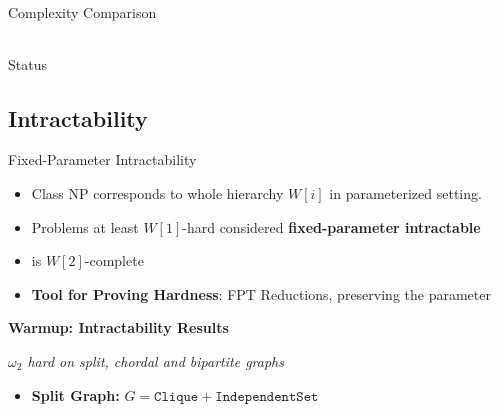 \begin{frame}[c]{Complexity Comparison}
{\begin{tabularx}{1.5\textwidth}{lllllll}
    \end{tabularx}
}
\end{frame}

\begin{frame}[c]{Status \sdom}
 \begin{figure}
    \centering

    \makeatletter
    \resizebox{0.7\textwidth}{!}{
        
    }
    \makeatother
\end{figure}
\end{frame}

\subsection{Intractability}
\begin{frame}[c]{Fixed-Parameter Intractability}
    \begin{itemize}
        \item  Class NP corresponds to whole hierarchy $W[i]$ in parameterized setting.
        \item Problems at least $W[1]$-hard considered \textbf{fixed-parameter intractable}
        \item \dom is $W[2]$-complete
        \item \textbf{Tool for Proving Hardness}: FPT Reductions, preserving the parameter
    \end{itemize}

\end{frame}


\begin{frame}[c]{}
    \begin{center}
        \textbf{Warmup: Intractability Results}

        \textit{$\omega_2$ hard on split, chordal and bipartite graphs}
    \end{center}

    \begin{itemize}
        \item \textbf{Split Graph:} $G = \mathtt{Clique} + \mathtt{Independent Set}$
    \end{itemize}

\end{frame}

